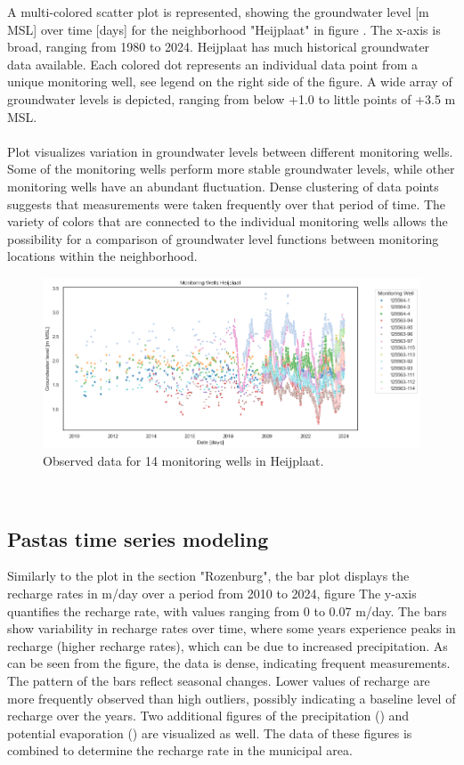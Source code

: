 A multi-colored scatter plot is represented, showing the groundwater level [m MSL] over time [days] for the neighborhood "Heijplaat" in figure . The x-axis is broad, ranging from 1980 to 2024. Heijplaat has much historical groundwater data available. Each colored dot represents an individual data point from a unique monitoring well, see legend on the right side of the figure. A wide array of groundwater levels is depicted, ranging from below +1.0 to little points of +3.5 m MSL. 
\\
\\
Plot  visualizes variation in groundwater levels between different monitoring wells. Some of the monitoring wells perform more stable groundwater levels, while other monitoring wells have an abundant fluctuation. Dense clustering of data points suggests that measurements were taken frequently over that period of time. The variety of colors that are connected to the individual monitoring wells allows the possibility for a comparison of groundwater level functions between monitoring locations within the neighborhood. \\
\begin{figure}[htbp]
    \centering
    \includegraphics[width=0.75\linewidth]{frontmatter/Heijplaat-fig/heijoverzicht.png}
    \caption{Observed data for 14 monitoring wells in Heijplaat.}
    \label{summheij}
\end{figure}\\

\subsection{Pastas time series modeling}
Similarly to the plot in the section "Rozenburg", the bar plot displays the recharge rates in m/day over a period from 2010 to 2024, figure  The y-axis quantifies the recharge rate, with values ranging from 0 to 0.07 m/day. The bars show variability in recharge rates over time, where some years experience peaks in recharge (higher recharge rates), which can be due to increased precipitation. As can be seen from the figure, the data is dense, indicating frequent measurements. The pattern of the bars reflect seasonal changes. Lower values of recharge are more frequently observed than high outliers, possibly indicating a baseline level of recharge over the years. Two additional figures of the precipitation () and potential evaporation () are visualized as well. The data of these figures is combined to determine the recharge rate in the municipal area. 

